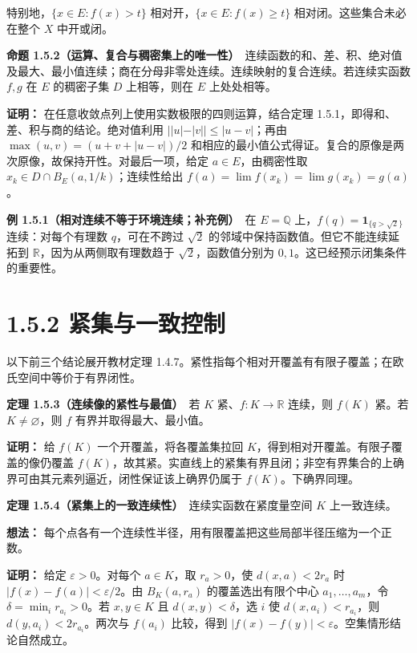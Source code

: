 \documentclass[11pt,a4paper]{article}
\begin{document}
特别地，\(\{x\in E:f(x)>t\}\) 相对开，\(\{x\in E:f(x)\ge t\}\)
相对闭。这些集合未必在整个 \(X\) 中开或闭。

\textbf{命题
1.5.2（运算、复合与稠密集上的唯一性）}　连续函数的和、差、积、绝对值及最大、最小值连续；商在分母非零处连续。连续映射的复合连续。若连续实函数
\(f,g\) 在 \(E\) 的稠密子集 \(D\) 上相等，则在 \(E\) 上处处相等。

\textbf{证明：} 在任意收敛点列上使用实数极限的四则运算，结合定理
1.5.1，即得和、差、积与商的结论。绝对值利用 \(||u|-|v||\le|u-v|\)；再由
\(\max(u,v)=(u+v+|u-v|)/2\)
和相应的最小值公式得证。复合的原像是两次原像，故保持开性。对最后一项，给定
\(a\in E\)，由稠密性取 \(x_k\in D\cap B_E(a,1/k)\)；连续性给出
\(f(a)=\lim f(x_k)=\lim g(x_k)=g(a)\)。

\textbf{例 1.5.1（相对连续不等于环境连续；补充例）}　在 \(E=\mathbb Q\)
上，\(f(q)=\mathbf1_{\{q>\sqrt2\}}\) 连续：对每个有理数
\(q\)，可在不跨过 \(\sqrt2\) 的邻域中保持函数值。但它不能连续延拓到
\(\mathbb R\)，因为从两侧取有理数趋于 \(\sqrt2\)，函数值分别为
\(0,1\)。这已经预示闭集条件的重要性。

\section[\S{}1.5.2
紧集与一致控制]{1.5.2
紧集与一致控制}\label{ux7d27ux96c6ux4e0eux4e00ux81f4ux63a7ux5236}

以下前三个结论展开教材定理
1.4.7。紧性指每个相对开覆盖有有限子覆盖；在欧氏空间中等价于有界闭性。

\textbf{定理 1.5.3（连续像的紧性与最值）}　若 \(K\)
紧、\(f:K\to\mathbb R\) 连续，则 \(f(K)\) 紧。若 \(K\ne\varnothing\)，则
\(f\) 有界并取得最大、最小值。

\textbf{证明：} 给 \(f(K)\) 一个开覆盖，将各覆盖集拉回
\(K\)，得到相对开覆盖。有限子覆盖的像仍覆盖
\(f(K)\)，故其紧。实直线上的紧集有界且闭；非空有界集合的上确界可由其元素列逼近，闭性保证该上确界仍属于
\(f(K)\)。下确界同理。

\textbf{定理 1.5.4（紧集上的一致连续性）}　连续实函数在紧度量空间 \(K\)
上一致连续。

\textbf{想法：}
每个点各有一个连续性半径，用有限覆盖把这些局部半径压缩为一个正数。

\textbf{证明：} 给定 \(\varepsilon>0\)。对每个 \(a\in K\)，取
\(r_a>0\)，使 \(d(x,a)<2r_a\) 时 \(|f(x)-f(a)|<\varepsilon/2\)。由
\(B_K(a,r_a)\) 的覆盖选出有限个中心 \(a_1,\ldots,a_m\)，令
\(\delta=\min_i r_{a_i}>0\)。若 \(x,y\in K\) 且 \(d(x,y)<\delta\)，选
\(i\) 使 \(d(x,a_i)<r_{a_i}\)，则 \(d(y,a_i)<2r_{a_i}\)。两次与
\(f(a_i)\) 比较，得到
\(|f(x)-f(y)|<\varepsilon\)。空集情形结论自然成立。
\end{document}
